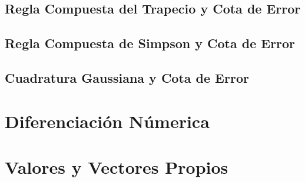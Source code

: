 \documentclass[10pt,a4paper]{article}
\begin{document}
	
	
	\subsection{Regla Compuesta del Trapecio y Cota de Error}
	
		
	
	\subsection{Regla Compuesta de Simpson y Cota de Error}

	
	\subsection{Cuadratura Gaussiana y Cota de Error}
	
	\section{Diferenciación Númerica}
	
	
	\section{Valores y Vectores Propios}
	
\end{document}
